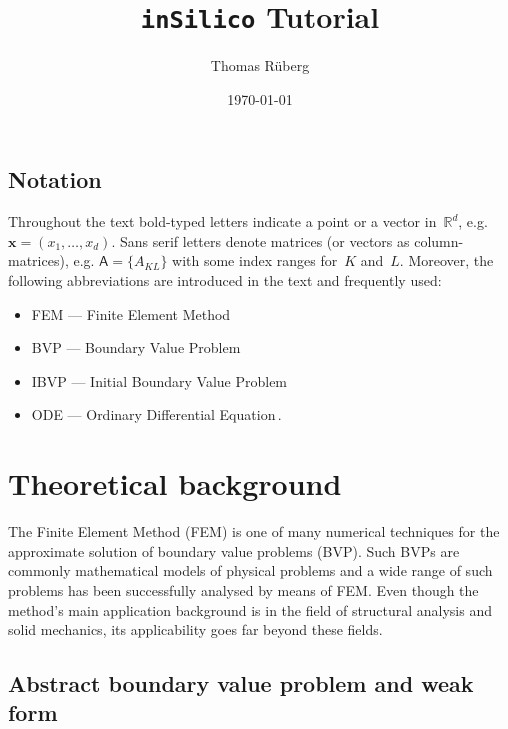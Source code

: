 \documentclass[a4paper,DIV=12,10pt]{scrartcl}
\newcommand{\vek}[1]{\boldsymbol{#1}}  %
\newcommand{\mat}[1]{\mathsf{#1}}      %
\newcommand{\x}[0]{\vek{x}}
\begin{document}
\author{Thomas R\"uberg}
\date{\today}
\title{\texttt{inSilico} Tutorial}
\maketitle

\tableofcontents{}

\subsection*{Notation}
Throughout the text bold-typed letters indicate a point or a vector
in~$\mathbb{R}^d$, e.g. \mbox{$\x = (x_1, \dotsc, x_d)$}. Sans serif letters
denote matrices (or vectors as column-matrices), e.g. \mbox{$\mat{A} =
\{A_{KL}\}$} with some index ranges for~$K$ and~$L$. Moreover, the
following abbreviations are introduced in the text and frequently
used:
\begin{itemize}
\item FEM --- Finite Element Method
\item BVP --- Boundary Value Problem
\item IBVP --- Initial Boundary Value Problem
\item ODE  --- Ordinary Differential Equation\,.
\end{itemize}

\section{Theoretical background}
\label{sec:fem}

The Finite Element Method (FEM) is one of many numerical techniques
for the approximate solution of boundary value problems (BVP). Such
BVPs are commonly mathematical models of physical problems and a wide
range of such problems has been successfully analysed by means of
FEM. Even though the method's main application background is in the
field of structural analysis and solid mechanics, its applicability
goes far beyond these fields.

\subsection{Abstract boundary value problem and weak form}
\label{sec:bvp}
\end{document}
